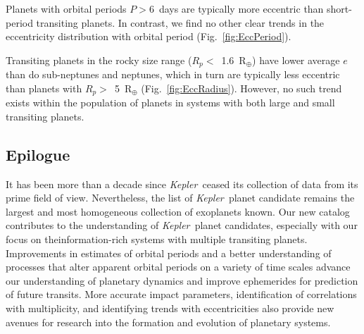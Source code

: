 \documentclass{aastex62}
\newcommand{\ik}{{\it Kepler~}}
\begin{document}
Planets with orbital periods $P > 6$~days are typically more eccentric than  short-period transiting planets.  In contrast, we find no other clear trends in the eccentricity distribution with orbital period (Fig.~\ref{fig:EccPeriod}). 

Transiting planets in the rocky size range ($R_p <$~1.6~R$_\oplus$) have lower average $e$ than do sub-neptunes and neptunes, which in turn are typically less eccentric than planets with $R_p >$~5~R$_\oplus$ (Fig.~\ref{fig:EccRadius}). However, no such trend exists within the population of planets in systems with both large and small transiting planets.


\subsection{Epilogue}
It has been more than a decade since \ik ceased its collection of data from its prime field of view. Nevertheless, the list of \ik planet candidate remains the largest and most homogeneous collection of exoplanets known. Our new catalog contributes to the understanding of \ik planet candidates, especially with our focus on theinformation-rich systems with multiple transiting planets. Improvements in estimates of orbital periods and a better understanding of processes that alter apparent orbital periods on a variety of time scales advance our understanding of planetary dynamics and improve ephemerides for prediction of future transits. More accurate impact parameters, identification of correlations with multiplicity, and identifying trends with eccentricities also provide new avenues for research into the formation and evolution of planetary systems.  
\end{document}
